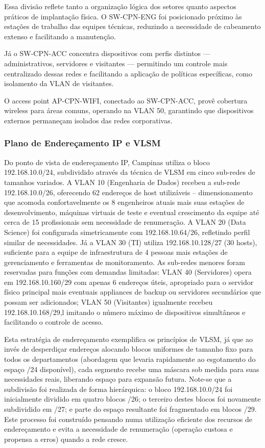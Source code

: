 \documentclass[12pt,a4paper]{article}
\begin{document}
Essa divisão reflete tanto a organização lógica dos setores quanto aspectos práticos de implantação física. O SW-CPN-ENG foi posicionado próximo às estações de trabalho das equipes técnicas, reduzindo a necessidade de cabeamento extenso e facilitando a manutenção.

Já o SW-CPN-ACC concentra dispositivos com perfis distintos — administrativos, servidores e visitantes — permitindo um controle mais centralizado dessas redes e facilitando a aplicação de políticas específicas, como isolamento da VLAN de visitantes.

O access point AP-CPN-WIFI, conectado ao SW-CPN-ACC, provê cobertura wireless para áreas comuns, operando na VLAN 50, garantindo que dispositivos externos permaneçam isolados das redes corporativas.

\subsubsection{Plano de Endereçamento IP e VLSM}
Do ponto de vista de endereçamento IP, Campinas utiliza o bloco 192.168.10.0/24, subdividido através da técnica de VLSM em cinco sub-redes de tamanhos variados. A VLAN 10 (Engenharia de Dados) recebeu a sub-rede 192.168.10.0/26, oferecendo 62 endereços de host utilizáveis -- dimensionamento que acomoda confortavelmente os 8 engenheiros atuais mais suas estações de desenvolvimento, máquinas virtuais de teste e eventual crescimento da equipe até cerca de 15 profissionais sem necessidade de renumeração. A VLAN 20 (Data Science) foi configurada simetricamente com 192.168.10.64/26, refletindo perfil similar de necessidades. Já a VLAN 30 (TI) utiliza 192.168.10.128/27 (30 hosts), suficiente para a equipe de infraestrutura de 4 pessoas mais estações de gerenciamento e ferramentas de monitoramento. As sub-redes menores foram reservadas para funções com demandas limitadas: VLAN 40 (Servidores) opera em 192.168.10.160/29 com apenas 6 endereços úteis, apropriado para o servidor físico principal mais eventuais appliances de backup ou servidores secundários que possam ser adicionados; VLAN 50 (Visitantes) igualmente recebeu 192.168.10.168/29,l imitando o número máximo de dispositivos simultâneos e facilitando o controle de acesso.

Esta estratégia de endereçamento exemplifica os princípios de VLSM, já que ao invés de desperdiçar endereços alocando blocos uniformes de tamanho fixo para todos os departamentos (abordagem que levaria rapidamente ao esgotamento do espaço /24 disponível), cada segmento recebe uma máscara sob medida para suas necessidades reais, liberando espaço para expansão futura. Note-se que a subdivisão foi realizada de forma hierárquica: o bloco 192.168.10.0/24 foi inicialmente dividido em quatro blocos /26; o terceiro destes blocos foi novamente subdividido em /27; e parte do espaço resultante foi fragmentado em blocos /29. Este processo foi construído pensando numa utilização eficiente dos recursos de endereçamento e evita a necessidade de renumeração (operação custosa e propensa a erros) quando a rede cresce.
\end{document}
